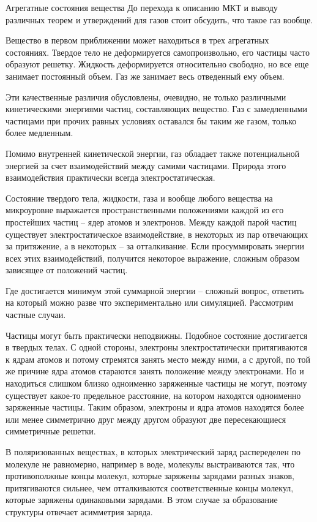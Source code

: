 \documentclass{article}
\begin{document}
	\begin{section}{Агрегатные состояния вещества}
		До перехода к описанию МКТ и выводу различных теорем и утверждений для газов стоит обсудить, что такое газ вообще.

		Вещество в первом приближении может находиться в трех агрегатных состояниях. Твердое тело не деформируется самопроизвольно, его частицы часто образуют решетку. Жидкость деформируется относительно свободно, но все еще занимает постоянный объем. Газ же занимает весь отведенный ему объем.

		Эти качественные различия обусловлены, очевидно, не только различными кинетическими энергиями частиц, составляющих вещество. Газ с замедленными частицами при прочих равных условиях оставался бы таким же газом, только более медленным.

		Помимо внутренней кинетической энергии, газ обладает также потенциальной энергией за счет взаимодействий между самими частицами. Природа этого взаимодействия практически всегда электростатическая.

		Состояние твердого тела, жидкости, газа и вообще любого вещества на микроуровне выражается пространственными положениями каждой из его простейших частиц -- ядер атомов и электронов. Между каждой парой частиц существует электростатическое взаимодействие, в некоторых из пар отвечающих за притяжение, а в некоторых -- за отталкивание. Если просуммировать энергии всех этих взаимодействий, получится некоторое выражение, сложным образом зависящее от положений частиц.

		Где достигается минимум этой суммарной энергии -- сложный вопрос, ответить на который можно разве что экспериментально или симуляцией. Рассмотрим частные случаи.

		Частицы могут быть практически неподвижны. Подобное состояние достигается в твердых телах. С одной стороны, электроны электростатически притягиваются к ядрам атомов и потому стремятся занять место между ними, а с другой, по той же причине ядра атомов стараются занять положение между электронами. Но и находиться слишком близко одноименно заряженные частицы не могут, поэтому существует какое-то предельное расстояние, на котором находятся одноименно заряженные частицы. Таким образом, электроны и ядра атомов находятся более или менее симметрично друг между другом образуют две пересекающиеся симметричные решетки.

		В поляризованных веществах, в которых электрический заряд распеределен по молекуле не равномерно, например в воде, молекулы выстраиваются так, что противополжные концы молекул, которые заряжены зарядами разных знаков, притягиваются сильнее, чем отталкиваются соответственные концы молекул, которые заряжены одинаковыми зарядами. В этом случае за образование структуры отвечает асимметрия заряда.


\end{section}
\end{document}
